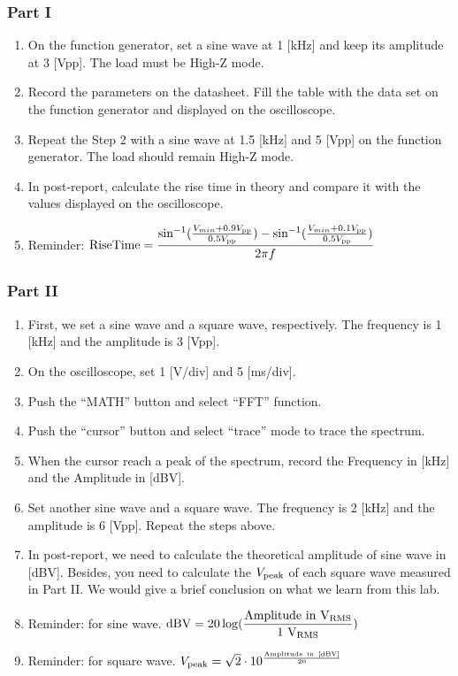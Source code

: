 \documentclass[a4paper]{report}
\begin{document}
\subsubsection{Part I}
\begin{enumerate}
	\item On the function generator, set a sine wave at 1 [kHz] and keep its amplitude at 3 [Vpp]. The load must be High-Z mode.
	\item Record the parameters on the datasheet. Fill the table with the data set on the function generator and displayed on the oscilloscope.
	\item Repeat the Step 2 with a sine wave at 1.5 [kHz] and 5 [Vpp] on the function generator. The load should remain High-Z mode.
	\item In post-report, calculate the rise time in theory and compare it with the values displayed on the oscilloscope.
	\item Reminder: $\mathrm{RiseTime}=\dfrac{\sin^{-1}(\frac{V_{min}+0.9V_{\rm{pp}}}{0.5V_{\rm{pp}}})-\sin^{-1}(\frac{V_{min}+0.1V_{\rm{pp}}}{0.5V_{\rm{pp}}})}{2\pi f}$
\end{enumerate}
\subsubsection{Part II}
\begin{enumerate}
	\item First, we set a sine wave and a square wave, respectively. The frequency is 1 [kHz] and the amplitude is 3 [Vpp].
	\item On the oscilloscope, set 1 [V/div] and 5 [ms/div].
	\item Push the “MATH” button and select “FFT” function.
	\item Push the “cursor” button and select “trace” mode to trace the spectrum.
	\item When the cursor reach a peak of the spectrum, record the Frequency in [kHz] and the Amplitude in [dBV].
	\item Set another sine wave and a square wave. The frequency is 2 [kHz] and the amplitude is 6 [Vpp]. Repeat the steps above.
	\item In post-report, we need to calculate the theoretical amplitude of sine wave in [dBV]. Besides, you need to calculate the $V_{\rm{peak}}$ of each square wave measured in Part II. We would give a brief conclusion on what we learn from this lab.
	\item Reminder: for sine wave. $\rm{dBV}=20\log(\dfrac{\rm{Amplitude\ in}\ V_{\rm{RMS}}}{1\ V_{\rm{RMS}}})$
	\item Reminder: for square wave. $V_{\rm{peak}}=\sqrt{2}\cdot10^{\frac{\rm{Amplitude\ in\ [\rm{dBV}]}}{20}}$
\end{enumerate}
\end{document}
